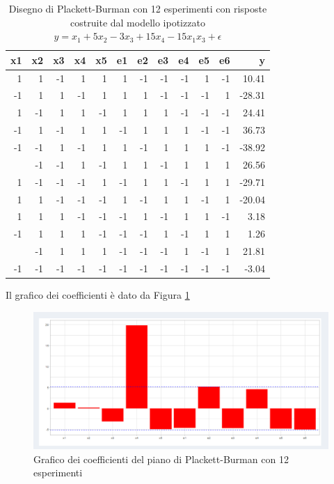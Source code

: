 \documentclass[
  11pt,
]{book}
\begin{document}
\begin{table}

\caption{\label{tab:pb12}Disegno di Plackett-Burman con 12 esperimenti con risposte costruite dal modello ipotizzato
            $y=x_1+5x_2-3x_3+15x_4-15x_1x_3+\epsilon$ }
\centering
\begin{tabular}[t]{rrrrrrrrrrrr}
\toprule
x1 & x2 & x3 & x4 & x5 & e1 & e2 & e3 & e4 & e5 & e6 & y\\
\midrule
1 & 1 & -1 & 1 & 1 & 1 & -1 & -1 & -1 & 1 & -1 & 10.41\\
-1 & 1 & 1 & -1 & 1 & 1 & 1 & -1 & -1 & -1 & 1 & -28.31\\
1 & -1 & 1 & 1 & -1 & 1 & 1 & 1 & -1 & -1 & -1 & 24.41\\
-1 & 1 & -1 & 1 & 1 & -1 & 1 & 1 & 1 & -1 & -1 & 36.73\\
-1 & -1 & 1 & -1 & 1 & 1 & -1 & 1 & 1 & 1 & -1 & -38.92\\
\addlinespace
-1 & -1 & -1 & 1 & -1 & 1 & 1 & -1 & 1 & 1 & 1 & 26.56\\
1 & -1 & -1 & -1 & 1 & -1 & 1 & 1 & -1 & 1 & 1 & -29.71\\
1 & 1 & -1 & -1 & -1 & 1 & -1 & 1 & 1 & -1 & 1 & -20.04\\
1 & 1 & 1 & -1 & -1 & -1 & 1 & -1 & 1 & 1 & -1 & 3.18\\
-1 & 1 & 1 & 1 & -1 & -1 & -1 & 1 & -1 & 1 & 1 & 1.26\\
\addlinespace
1 & -1 & 1 & 1 & 1 & -1 & -1 & -1 & 1 & -1 & 1 & 21.81\\
-1 & -1 & -1 & -1 & -1 & -1 & -1 & -1 & -1 & -1 & -1 & -3.04\\
\bottomrule
\end{tabular}
\end{table}

Il grafico dei coefficienti è dato da Figura \ref{fig:pb8}

\begin{figure}[ht]

{\centering \includegraphics[width=1\linewidth]{Immagini/PB/08_coeff12} 

}

\caption{Grafico dei coefficienti del piano di Plackett-Burman con 12 esperimenti}\label{fig:pb8}
\end{figure}
\end{document}
